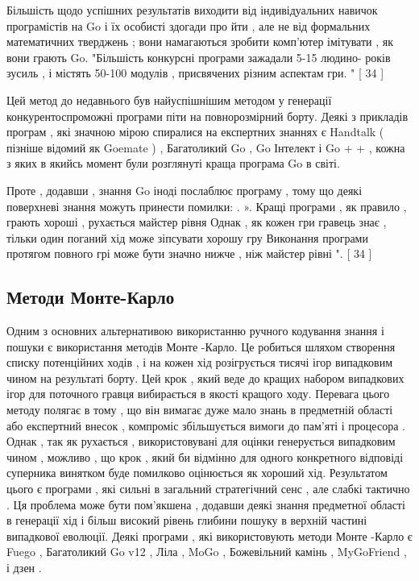 Більшість щодо успішних результатів виходити від індивідуальних навичок програмістів на Go і їх особисті здогади про йти , але не від формальних математичних тверджень ; вони намагаються зробити комп'ютер імітувати , як вони грають Go. "Більшість конкурсні програми зажадали 5-15 людино- років зусиль , і містять 50-100 модулів , присвячених різним аспектам гри. " [ 34 ]

Цей метод до недавнього був найуспішнішим методом у генерації конкурентоспроможні програми піти на повнорозмірний борту. Деякі з прикладів програм , які значною мірою спиралися на експертних знаннях є Handtalk ( пізніше відомий як Goemate ) , Багатоликий Go , Go Інтелект і Go + + , кожна з яких в якийсь момент були розглянуті краща програма Go в світі.

Проте , додавши , знання Go іноді послаблює програму , тому що деякі поверхневі знання можуть принести помилки: . ». Кращі програми , як правило , грають хороші , рухається майстер рівня Однак , як кожен гри гравець знає , тільки один поганий хід може зіпсувати хорошу гру Виконання програми протягом повного грі може бути значно нижче , ніж майстер рівні ". [ 34 ]

\subsection{Методи Монте-Карло}
Одним з основних альтернативою використанню ручного кодування знання і пошуки є використання методів Монте -Карло. Це робиться шляхом створення списку потенційних ходів , і на кожен хід розігрується тисячі ігор випадковим чином на результаті борту. Цей крок , який веде до кращих набором випадкових ігор для поточного гравця вибирається в якості кращого ходу. Перевага цього методу полягає в тому , що він вимагає дуже мало знань в предметній області або експертний внесок , компроміс збільшується вимоги до пам'яті і процесора . Однак , так як рухається , використовувані для оцінки генерується випадковим чином , можливо , що крок , який би відмінно для одного конкретного відповіді суперника винятком буде помилково оцінюється як хороший хід. Результатом цього є програми , які сильні в загальний стратегічний сенс , але слабкі тактично . Ця проблема може бути пом'якшена , додавши деякі знання предметної області в генерації хід і більш високий рівень глибини пошуку в верхній частині випадкової еволюції. Деякі програми , які використовують методи Монте -Карло є Fuego , Багатоликий Go v12 , Ліла , MoGo , Божевільний камінь , MyGoFriend , і дзен .

